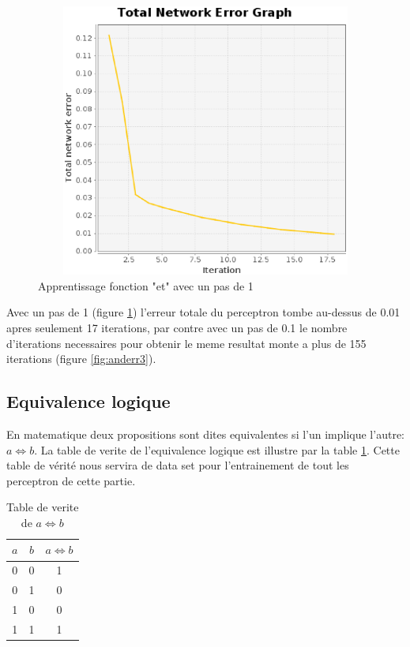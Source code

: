 \documentclass[twoside,openright,a4paper,11pt,french]{article}
\begin{document}
\begin{figure}[h]
\centering
\includegraphics[width=12cm,height=9cm]{./pics/and_error4.eps}
\caption{Apprentissage fonction "et" avec un pas de 1}
\label{fig:anderr4}
\end{figure}

Avec un pas de 1 (figure \ref{fig:anderr4}) l'erreur totale du perceptron
tombe au-dessus de 0.01 apres seulement 17 iterations, par contre avec 
un pas de 0.1 le nombre d'iterations necessaires pour obtenir le meme
resultat monte a plus de 155 iterations (figure \ref{fig:anderr3}).

\subsection{Equivalence logique}
En matematique deux propositions sont dites equivalentes si l'un implique
l'autre: $a \Leftrightarrow b$. La table de verite de l'equivalence logique
est illustre par la table \ref{tab:eq}.
Cette table de vérité nous servira de data set pour l'entrainement de tout
les perceptron de cette partie.


\begin{table}[h]
  \centering
  \begin{tabular}{| c | c | c |}
    \hline
    \textbf{$a$} & \textbf{$b$} & \textbf{$a \Leftrightarrow b$}\\
    \hline
    0 & 0  & 1 \\
    \hline
    0 & 1  & 0 \\
    \hline
    1 & 0  & 0 \\
    \hline
    1 & 1  & 1 \\
    \hline
  \end{tabular}
  \caption{Table de verite de $a \Leftrightarrow b$}
  \label{tab:eq}
\end{table}
\end{document}
